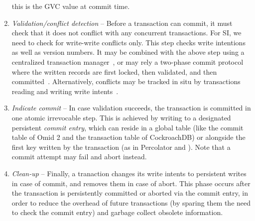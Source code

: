 \begin{enumerate}
  this is the GVC value at commit time. 
   \item \emph{Validation/conflict detection} -- Before a transaction can commit, it must check that it does not conflict with any 
  concurrent transactions.  For SI, we need to check for write-write conflicts only. 
  This step checks write intentions as well as version numbers. It may be combined  with the above step using a centralized 
  transaction manager~\cite{OmidICDE2014,tephra,omid-blog}, or may rely a two-phase commit protocol where the written records are first 
  locked, then validated, and then committed~\cite{Percolator2010}. 
  Alternatively, conflicts may be tracked in situ   by transactions   reading and writing write intents~\cite{cockroach}.
  \item \emph{Indicate commit} --  In case validation succeeds, the transaction is committed 
  in one atomic irrevocable  step. This is achieved by writing to a designated persistent \emph{commit entry}, 
  which can reside in a global table (like the commit table of 
  Omid 2 and the transaction table of CockroachDB) or alongside the first  key written by 
  the transaction (as in Percolator and \sys).  Note that a commit attempt may fail and abort instead. 
  \item \emph{Clean-up} -- Finally, a tranaction changes its write intents to
  persistent writes in case of commit, and removes them in case of abort. This
  phase occurs after the transaction is persistently committed or aborted via the commit entry, in
  order to reduce the overhead of future transactions (by sparing them the need to check the commit entry)
  and garbage collect   obsolete information. 
\end{enumerate}

 